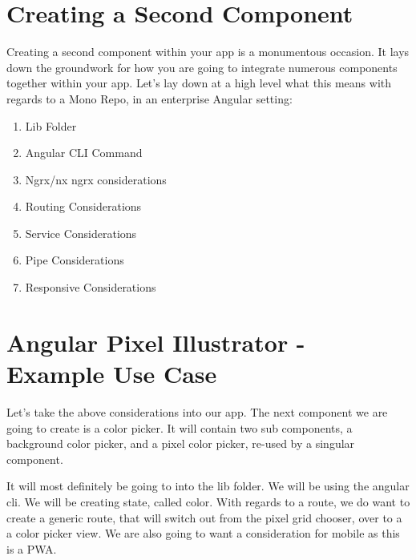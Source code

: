 \maketitle{}
\section{ Creating a Second Component }
Creating a second component within your app is a monumentous occasion. It lays
down the groundwork for how you are going to integrate numerous components
together within your app. Let's lay down at a high level what this means with
regards to a Mono Repo, in an enterprise Angular setting:

\begin{enumerate}
  \item Lib Folder
  \item Angular CLI Command
  \item Ngrx/nx ngrx considerations
  \item Routing Considerations
  \item Service Considerations
  \item Pipe Considerations
  \item Responsive Considerations
\end{enumerate}

\section{ Angular Pixel Illustrator - Example Use Case }
Let's take the above considerations into our app. The next component we are
going to create is a color picker. It will contain two sub components, a
background color picker, and a pixel color picker, re-used by a singular
component.

It will most definitely be going to into the lib folder. We will be using the
angular cli. We will be creating state, called color. With regards to a route,
we do want to create a generic route, that will switch out from the pixel grid
chooser, over to a a color picker view. We are also going to want a
consideration for mobile as this is a PWA.
